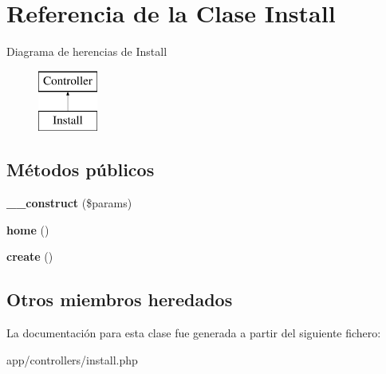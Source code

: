 \hypertarget{class_install}{}\section{Referencia de la Clase Install}
\label{class_install}
Diagrama de herencias de Install\begin{figure}[H]
\begin{center}
\leavevmode
\includegraphics[height=2.000000cm]{class_install}
\end{center}
\end{figure}
\subsection*{Métodos públicos}
\begin{DoxyCompactItemize}
\item 
\hypertarget{class_install_a9162320adff1a1a4afd7f2372f753a3e}{}{\bfseries \+\_\+\+\_\+construct} (\$params)\label{class_install_a9162320adff1a1a4afd7f2372f753a3e}

\item 
\hypertarget{class_install_a174b8e4c7d4d7363c6f773671defdeff}{}{\bfseries home} ()\label{class_install_a174b8e4c7d4d7363c6f773671defdeff}

\item 
\hypertarget{class_install_a435e7d7525d4bcd0ed5e34a469f3adf6}{}{\bfseries create} ()\label{class_install_a435e7d7525d4bcd0ed5e34a469f3adf6}

\end{DoxyCompactItemize}
\subsection*{Otros miembros heredados}


La documentación para esta clase fue generada a partir del siguiente fichero\+:\begin{DoxyCompactItemize}
\item 
app/controllers/install.\+php\end{DoxyCompactItemize}
